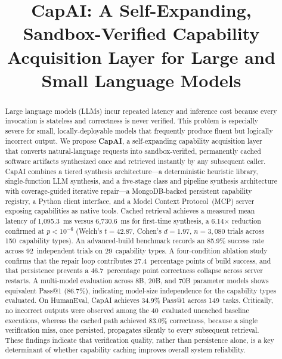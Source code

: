 \documentclass[conference]{IEEEtran}
\begin{document}
\title{CapAI: A Self-Expanding, Sandbox-Verified Capability Acquisition
       Layer for Large and Small Language Models}

\author{
}

\maketitle

\begin{abstract}
Large language models (LLMs) incur repeated latency and inference cost
because every invocation is stateless and correctness is never verified.
This problem is especially severe for small, locally-deployable models
that frequently produce fluent but logically incorrect output.
We propose \textbf{CapAI}, a self-expanding capability acquisition layer
that converts natural-language requests into sandbox-verified, permanently
cached software artifacts synthesized once and retrieved instantly by any
subsequent caller. CapAI combines a tiered synthesis architecture---a
deterministic heuristic library, single-function LLM synthesis, and a
five-stage class and pipeline synthesis architecture with coverage-guided
iterative repair---a MongoDB-backed persistent capability registry, a
Python client interface, and a Model Context Protocol~(MCP) server
exposing capabilities as native tools.
Cached retrieval achieves a measured mean latency of 1{,}095.3~ms versus
6{,}730.6~ms for first-time synthesis, a 6.14$\times$ reduction confirmed
at $p < 10^{-6}$ (Welch's $t = 42.87$, Cohen's $d = 1.97$,
$n = 3{,}080$ trials across 150~capability types).
An advanced-build benchmark records an 85.9\% success rate across
92~independent trials on 29~capability types.
A four-condition ablation study confirms that the repair loop contributes
27.4~percentage points of build success, and that persistence prevents a
46.7~percentage point correctness collapse across server restarts.
A multi-model evaluation across 8B, 20B, and 70B parameter models shows
equivalent Pass@1 (86.7\%), indicating model-size independence for the
capability types evaluated.
On HumanEval, CapAI achieves 34.9\% Pass@1 across 149~tasks.
Critically, no incorrect outputs were observed among the 40~evaluated
uncached baseline executions, whereas the cached path achieved 83.0\%
correctness, because a single verification miss, once persisted,
propagates silently to every subsequent retrieval.
These findings indicate that verification quality, rather than persistence
alone, is a key determinant of whether capability caching improves overall
system reliability.
\end{abstract}
\end{document}
